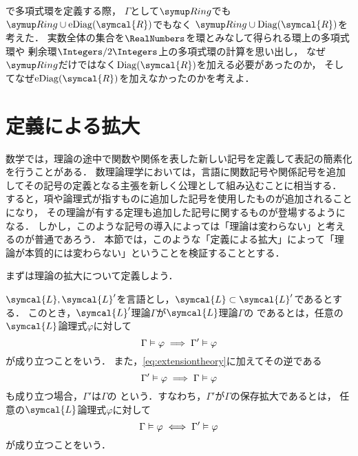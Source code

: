 \begin{Que} \label{Que:polynomialringherbrandmodel}
	で多項式環を定義する際，
	\(\Gamma\)として\(\Ring\)でも\(\Ring \cup \apply{\eDiag}{\symcal{R}}\)でもなく
	\(\Ring \cup \apply{\Diag}{\symcal{R}}\)を考えた．
	実数全体の集合を\(\RealNumbers\)を環とみなして得られる環上の多項式環や
	剰余環\(\Integers/2\Integers\)上の多項式環の計算を思い出し，
	なぜ\(\Ring\)だけではなく\(\apply{\Diag}{\symcal{R}}\)を加える必要があったのか，
	そしてなぜ\(\apply{\eDiag}{\symcal{R}}\)を加えなかったのかを考えよ．
\end{Que}


\section{定義による拡大} \label{sec:extensionbydefinition}

数学では，理論の途中で関数や関係を表した新しい記号を定義して表記の簡素化を行うことがある．
数理論理学においては，言語に関数記号や関係記号を追加してその記号の定義となる主張を新しく公理として組み込むことに相当する．
すると，項や論理式が指すものに追加した記号を使用したものが追加されることになり，
その理論が有する定理も追加した記号に関するものが登場するようになる．
しかし，このような記号の導入によっては「理論は変わらない」と考えるのが普通であろう．
本節では，このような「定義による拡大」によって「理論が本質的には変わらない」ということを検証することとする．

まずは理論の拡大について定義しよう．

\begin{Def} \label{Def:extensiontheory}
	\(\symcal{L}, \symcal{L}'\)を言語とし，\(\symcal{L} \subset \symcal{L}'\)であるとする．
	このとき，\(\symcal{L}'\)理論\(\Gamma\)が\(\symcal{L}\)理論\(\Gamma\)の%
	であるとは，任意の\(\symcal{L}\)論理式\(\varphi\)に対して
	\begin{equation}
		\Gamma \vDash \varphi \implies \Gamma' \vDash \varphi
		\label{eq:extensiontheory}
	\end{equation}
	が成り立つことをいう．
	また，\cref{eq:extensiontheory}に加えてその逆である
	\begin{equation}
		\Gamma' \vDash \varphi \implies \Gamma \vDash \varphi
		\label{eq:conservationextensiontheoryoneside}
	\end{equation}
	も成り立つ場合，\(\Gamma'\)は\(\Gamma\)の%
	という．すなわち，\(\Gamma'\)が\(\Gamma\)の保存拡大であるとは，
	任意の\(\symcal{L}\)論理式\(\varphi\)に対して
	\begin{equation}
		\Gamma \vDash \varphi \iff \Gamma' \vDash \varphi
		\label{eq:conservationextensiontheory}
	\end{equation}
	が成り立つことをいう．
\end{Def}

